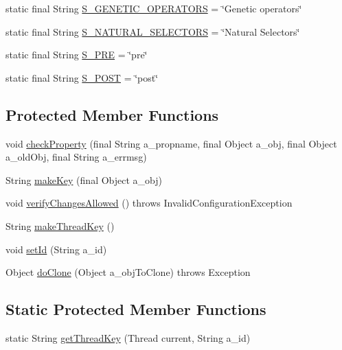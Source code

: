 \begin{DoxyCompactItemize}
\item 
static final String \hyperlink{classorg_1_1jgap_1_1_configuration_ab6775b7e58ce67558ab8c150d89461a1}{S\-\_\-\-G\-E\-N\-E\-T\-I\-C\-\_\-\-O\-P\-E\-R\-A\-T\-O\-R\-S} = \char`\"{}Genetic operators\char`\"{}
\item 
static final String \hyperlink{classorg_1_1jgap_1_1_configuration_ac91782f7ad308a5b41526383d1746a18}{S\-\_\-\-N\-A\-T\-U\-R\-A\-L\-\_\-\-S\-E\-L\-E\-C\-T\-O\-R\-S} = \char`\"{}Natural Selectors\char`\"{}
\item 
static final String \hyperlink{classorg_1_1jgap_1_1_configuration_a951ebe1745dbdac77825e060fd6df54d}{S\-\_\-\-P\-R\-E} = \char`\"{}pre\char`\"{}
\item 
static final String \hyperlink{classorg_1_1jgap_1_1_configuration_aff9c28a92d7b641a92ecaceb57cada54}{S\-\_\-\-P\-O\-S\-T} = \char`\"{}post\char`\"{}
\end{DoxyCompactItemize}
\subsection*{Protected Member Functions}
\begin{DoxyCompactItemize}
\item 
void \hyperlink{classorg_1_1jgap_1_1_configuration_ab9f2e0e6d7079234efad80c873659d66}{check\-Property} (final String a\-\_\-propname, final Object a\-\_\-obj, final Object a\-\_\-old\-Obj, final String a\-\_\-errmsg)
\item 
String \hyperlink{classorg_1_1jgap_1_1_configuration_a31144717f60c125b48e681d4ee39ce9e}{make\-Key} (final Object a\-\_\-obj)
\item 
void \hyperlink{classorg_1_1jgap_1_1_configuration_abfd5478b45575229ab03cb7a4159ac7c}{verify\-Changes\-Allowed} ()  throws Invalid\-Configuration\-Exception 
\item 
String \hyperlink{classorg_1_1jgap_1_1_configuration_ae0d997aecb9fd5e9c6bb3f223562d4c5}{make\-Thread\-Key} ()
\item 
void \hyperlink{classorg_1_1jgap_1_1_configuration_a586397372df2800d7c5a40c1d6556245}{set\-Id} (String a\-\_\-id)
\item 
Object \hyperlink{classorg_1_1jgap_1_1_configuration_a453c6b764b4f017c058632bc22e5a915}{do\-Clone} (Object a\-\_\-obj\-To\-Clone)  throws Exception 
\end{DoxyCompactItemize}
\subsection*{Static Protected Member Functions}
\begin{DoxyCompactItemize}
\item 
static String \hyperlink{classorg_1_1jgap_1_1_configuration_af18236f0e209d900916d139527fcf662}{get\-Thread\-Key} (Thread current, String a\-\_\-id)
\end{DoxyCompactItemize}
